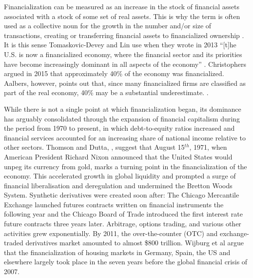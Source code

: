 Financialization can be measured as an increase in the stock of financial assets associated with a stock of some set of real assets. This is why the term is often used as a collective noun for the growth in the number and/or size of  transactions, creating or transferring financial assets to financialized ownership \cite{GET_financialization-numberOfTransactions}. %
It is this sense  Tomaskovic-Devey and Lin use when they wrote in 2013 ``[t]he U.S. is now a financialized economy, where the financial sector and its priorities have become increasingly dominant in all aspects of the economy'' \cite{tomaskovic-deveyFinancializationCausesInequality2013}. Christophers argued in 2015 that approximately 40\% of the economy was financialized. Aalbers, however, points out that, since many financialized firms are classified as part of the real economy, 40\% may be  a substantial underestimate. \cite{aalbersPotentialFinancialization2015}.

While there is not a single point at which financialization began, its dominance has arguably consolidated through the expansion of financial capitalism during the period from 1970 to present, in which debt-to-equity ratios increased and financial services accounted for an increasing share of national income relative to other sectors. Thomson and Dutta, \cite{thomsonFinancialisationPrimer2018}, suggest that August 15$^{th}$, 1971, when American President Richard Nixon announced that the United States would unpeg its currency from gold, marks a turning point in the financialization of the economy. This accelerated growth in global liquidity and prompted a surge of financial liberalisation and deregulation and undermined the Bretton Woods System. Synthetic derivatives were created soon after: The Chicago Mercantile Exchange launched futures contracts written on financial instruments the following year and the Chicago Board of Trade introduced the first interest rate future contracts three years later. Arbitrage, options trading, and various other activities grew exponentially. By 2011, the over-the-counter (OTC) and exchange-traded derivatives market amounted to almost \$800 trillion. Wijburg et al \cite{wijburgFinancialisationRentalHousing2018} argue that the financialization of housing markets in Germany, Spain, the US and elsewhere largely took place in the seven years before the global financial crisis  of 2007. 



